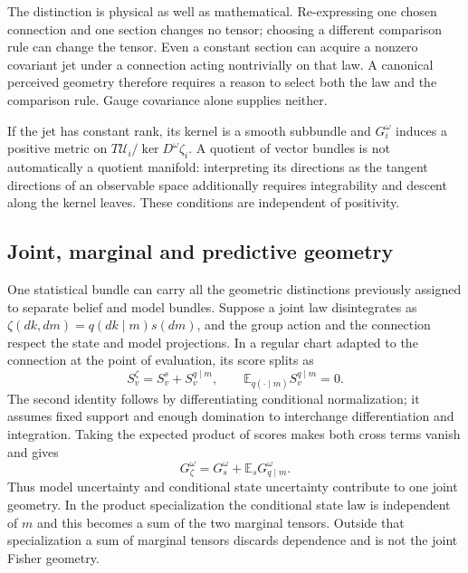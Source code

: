 The distinction is physical as well as mathematical. Re-expressing one chosen connection and one section changes no tensor; choosing a different comparison rule can change the tensor. Even a constant section can acquire a nonzero covariant jet under a connection acting nontrivially on that law. A canonical perceived geometry therefore requires a reason to select both the law and the comparison rule. Gauge covariance alone supplies neither.

If the jet has constant rank, its kernel is a smooth subbundle and $G_i^\omega$ induces a positive metric on $T\mathcal U_i/\ker D^\omega\zeta_i$. A quotient of vector bundles is not automatically a quotient manifold: interpreting its directions as the tangent directions of an observable space additionally requires integrability and descent along the kernel leaves. These conditions are independent of positivity.

\subsection{Joint, marginal and predictive geometry}
\label{sec:three_tiers}

One statistical bundle can carry all the geometric distinctions previously assigned to separate belief and model bundles. Suppose a joint law disintegrates as $\zeta(dk,dm)=q(dk\mid m)s(dm)$, and the group action and the connection respect the state and model projections. In a regular chart adapted to the connection at the point of evaluation, its score splits as
\begin{equation}
S_v^\zeta=S_v^s+S_v^{q\mid m},\qquad
\mathbb E_{q(\cdot\mid m)}S_v^{q\mid m}=0.
\end{equation}
The second identity follows by differentiating conditional normalization; it assumes fixed support and enough domination to interchange differentiation and integration. Taking the expected product of scores makes both cross terms vanish and gives
\begin{equation}
G_\zeta^\omega=G_s^\omega+\mathbb E_s G_{q\mid m}^\omega.
\label{eq:joint_fisher_decomposition}
\end{equation}
Thus model uncertainty and conditional state uncertainty contribute to one joint geometry. In the product specialization the conditional state law is independent of $m$ and this becomes a sum of the two marginal tensors. Outside that specialization a sum of marginal tensors discards dependence and is not the joint Fisher geometry.

